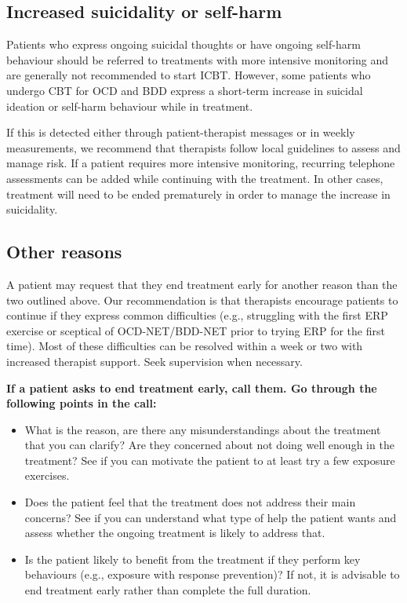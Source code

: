 \documentclass[]{book}
\providecommand{\tightlist}{%
  \setlength{\itemsep}{0pt}\setlength{\parskip}{0pt}}
\begin{document}
\hypertarget{increased-suicidality-or-self-harm}{%
\subsection{Increased suicidality or self-harm}\label{increased-suicidality-or-self-harm}}

Patients who express ongoing suicidal thoughts or have ongoing self-harm behaviour should be referred to treatments with more intensive monitoring and are generally not recommended to start ICBT. However, some patients who undergo CBT for OCD and BDD express a short-term increase in suicidal ideation or self-harm behaviour while in treatment.

If this is detected either through patient-therapist messages or in weekly measurements, we recommend that therapists follow local guidelines to assess and manage risk. If a patient requires more intensive monitoring, recurring telephone assessments can be added while continuing with the treatment. In other cases, treatment will need to be ended prematurely in order to manage the increase in suicidality.

\hypertarget{other-reasons}{%
\subsection{Other reasons}\label{other-reasons}}

A patient may request that they end treatment early for another reason than the two outlined above. Our recommendation is that therapists encourage patients to continue if they express common difficulties (e.g., struggling with the first ERP exercise or sceptical of OCD-NET/BDD-NET prior to trying ERP for the first time). Most of these difficulties can be resolved within a week or two with increased therapist support. Seek supervision when necessary.

\textbf{If a patient asks to end treatment early, call them. Go through the following points in the call:}

\begin{itemize}
\tightlist
\item
  What is the reason, are there any misunderstandings about the treatment that you can clarify? Are they concerned about not doing well enough in the treatment? See if you can motivate the patient to at least try a few exposure exercises.\\
\item
  Does the patient feel that the treatment does not address their main concerns? See if you can understand what type of help the patient wants and assess whether the ongoing treatment is likely to address that.\\
\item
  Is the patient likely to benefit from the treatment if they perform key behaviours (e.g., exposure with response prevention)? If not, it is advisable to end treatment early rather than complete the full duration.
\end{itemize}
\end{document}
